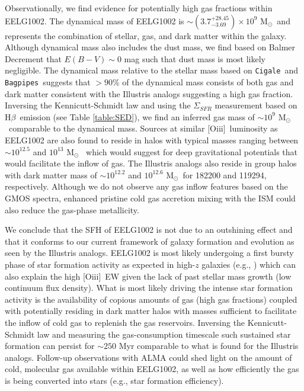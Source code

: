 \documentclass[twocolumn,tight,times,linenumbers]{aastex631}
\newcommand{\hbeta}{H$\beta$}
\newcommand{\oiii}{[O{\sc iii}]}
\newcommand{\msol}{M$_\odot$}
\newcommand{\cigale}{\texttt{Cigale}}
\newcommand{\bagpipes}{\texttt{Bagpipes}}
\begin{document}
		Observationally, we find evidence for potentially high gas fractions within EELG1002. The dynamical mass of EELG1002 is $\sim (3.7^{+28.45}_{-3.69}) \times 10^9$ \msol~and represents the combination of stellar, gas, and dark matter within the galaxy. Although dynamical mass also includes the dust mass, we find based on Balmer Decrement that $E(B - V) \sim 0$ mag such that dust mass is most likely negligible. The dynamical mass relative to the stellar mass based on \cigale~and \bagpipes~suggests that $> 90$\% of the dynamical mass consists of both gas and dark matter consistent with the Illustris analogs suggesting a high gas fraction. Inversing the Kennicutt-Schmidt law \citep{Kennicutt1998_KS} and using the $\Sigma_{SFR}$ measurement based on \hbeta~emission (see Table \ref{table:SED}), we find an inferred gas mass of $\sim 10^9$ \msol~comparable to the dynamical mass. Sources at similar \oiii~luminosity as EELG1002 are also found to reside in halos with typical masses ranging between $\sim 10^{12.5}$ and $10^{13}$ \msol~\citep{Khostovan2018} which would suggest for deep gravitational potentials that would facilitate the inflow of gas. The Illustris analogs also reside in group halos with dark matter mass of $\sim 10^{12.2}$ and $10^{12.6}$ \msol~for 182200 and 119294, respectively. Although we do not observe any gas inflow features based on the GMOS spectra, enhanced pristine cold gas accretion mixing with the ISM could also reduce the gas-phase metallicity. 
		
		We conclude that the SFH of EELG1002 is not due to an outshining effect and that it conforms to our current framework of galaxy formation and evolution as seen by the Illustris analogs. EELG1002 is most likely undergoing a first bursty phase of star formation activity as expected in high-$z$ galaxies (e.g., \citealt{Cohn2018}) which can also explain the high \oiii~EW given the lack of past stellar mass growth (low continuum flux density). What is most likely driving the intense star formation activity is the availability of copious amounts of gas (high gas fractions) coupled with potentially residing in dark matter halos with masses sufficient to facilitate the inflow of cold gas to replenish the gas reservoirs. Inversing the Kennicutt-Schmidt law \citep{Kennicutt1998_KS} and measuring the gas-consumption timescale such sustained star formation can persist for $\sim 250$ Myr comparable to what is found for the Illustris analogs. Follow-up observations with ALMA could shed light on the amount of cold, molecular gas available within EELG1002, as well as how efficiently the gas is being converted into stars (e.g., star formation efficiency).
		
\end{document}
